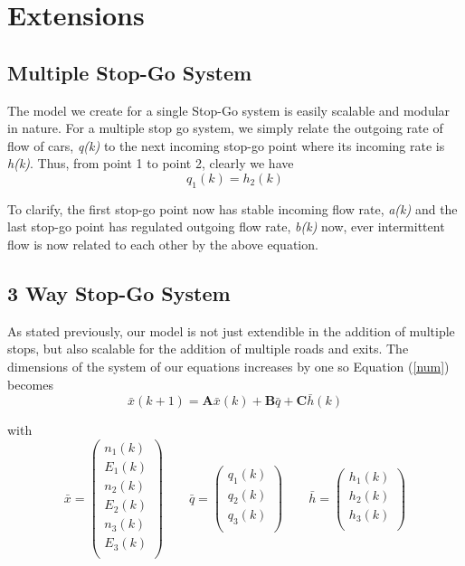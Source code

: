 \documentclass[a4paper]{article}
\begin{document}
\section{Extensions}

\subsection{Multiple Stop-Go System}

The model we create for a single Stop-Go system is easily scalable and modular in nature. For a multiple stop go system, we simply relate the outgoing rate of flow of cars, \textit{q(k)} to the next incoming stop-go point where its incoming rate is \textit{h(k)}. Thus, from point 1 to point 2, clearly we have
\[q_1 (k) = h_2 (k)\]

To clarify, the first stop-go point now has stable incoming flow rate, \textit{a(k)} and the last stop-go point has regulated outgoing flow rate, \textit{b(k)} now, ever intermittent flow is now related to each other by the above equation.

\subsection{3 Way Stop-Go System}

As stated previously, our model is not just extendible in the addition of multiple stops, but also scalable for the addition of multiple roads and exits. The dimensions of the system of our equations increases by one so Equation (\ref{num}) becomes
\begin{equation}
\bar{x} (k+1) = \textbf{A}\bar{x}(k) +\textbf{B}\bar{q} +\textbf{C}\bar{h}(k)
\end{equation}

with 
\[\bar{x}  = 
\begin{pmatrix}
n_1 (k) \\
E_1 (k) \\
n_2 (k) \\
E_2 (k) \\
n_3 (k) \\
E_3 (k) \\
\end{pmatrix} \qquad \bar{q} = 
\begin{pmatrix}
q_1 (k) \\
q_2 (k) \\
q_3 (k) \\
\end{pmatrix} \qquad \bar{h} = 
\begin{pmatrix}
h_1 (k) \\
h_2 (k) \\
h_3 (k) \\
\end{pmatrix}
\]
\end{document}
